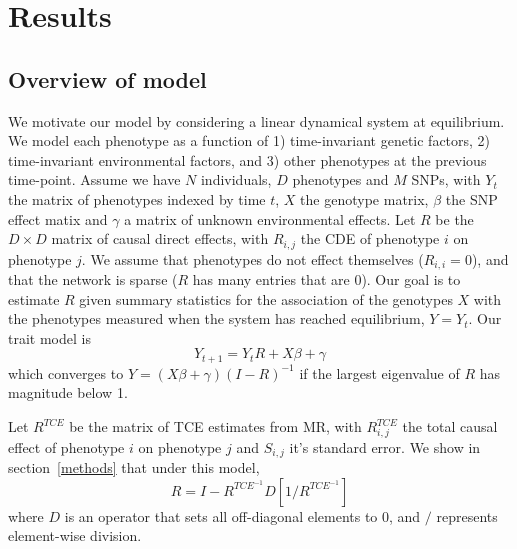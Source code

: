 \documentclass{article}
\begin{document}
\section{Results}
\subsection*{Overview of model}

We motivate our model by considering a linear dynamical system at equilibrium.
We model each phenotype as a function of 1) time-invariant genetic factors, 2)
time-invariant environmental factors, and 3) other phenotypes at the previous
time-point.
Assume we have $N$ individuals, $D$ phenotypes and $M$ SNPs,
with $Y_t$ the matrix of phenotypes indexed by time $t$, $X$ the genotype
matrix, $\beta$ the SNP effect matix and $\gamma$ a matrix of unknown
environmental effects. Let $R$ be the $D \times D$ matrix of
causal direct effects, with $R_{i, j}$ the CDE of phenotype $i$ on
phenotype $j$. We assume that phenotypes do not effect themselves ($R_{i,i} = 0$),
and that the network is sparse ($R$ has many entries that are $0$).
Our goal is to estimate $R$ given summary statistics
 for the association of the genotypes $X$ with the phenotypes measured when
 the system has reached equilibrium, $Y = Y_{t}$.
 Our trait model is
\begin{equation}
Y_{t+1} = Y_{t} R + X\beta + \gamma
\end{equation}
which converges to $Y = (X\beta + \gamma)(I-R)^{-1}$ if the largest eigenvalue
of $R$ has magnitude below 1.

Let $R^{TCE}$ be the matrix of TCE estimates from MR, with $R^{TCE}_{i,j}$ the total
causal effect of phenotype $i$ on phenotype $j$ and $S_{i,j}$ it's standard error.
We show in section~\ref{methods} that under this model,
\begin{equation}\label{r_cde_main}
R = I - R^{TCE^{-1}} D[1 / R^{TCE^{-1}}]
\end{equation}
where $D$ is an operator that sets all off-diagonal elements to 0, and $/$
represents element-wise division.
\end{document}
